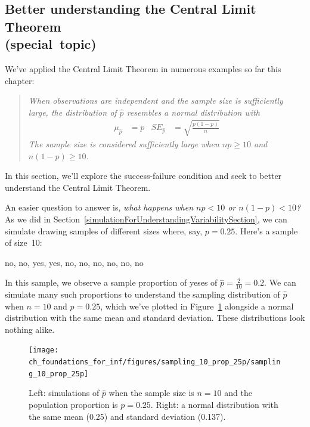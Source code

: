 \subsection[Better understanding the Central Limit Theorem
    (special~topic)]
  {Better understanding the Central Limit Theorem \\
      \mbox{(special~topic)}}



We've applied the Central Limit Theorem in numerous examples
so far this chapter:
\begin{quote}{\em
When observations are independent and the sample size is
sufficiently large, the distribution of $\hat{p}$ resembles
a normal distribution with
\begin{align*}
  \mu_{\hat{p}} &= p
  &SE_{\hat{p}} &= \sqrt{\frac{p (1 - p)}{n}}
\end{align*}
The sample size is considered sufficiently large
when $n p \geq 10$ and $n (1 - p) \geq 10$.
}\end{quote}
In this section, we'll explore the success-failure
condition and seek to better understand the
Central Limit Theorem.

An easier question to answer is, \emph{what happens when
$np < 10$ or $n(1-p) < 10$?} As we did in
Section~\ref{simulationForUnderstandingVariabilitySection},
we can simulate drawing samples of different sizes where,
say, $p = 0.25$. Here's a sample of
size~10:
\begin{center}
no, no, yes, yes, no, no, no, no, no, no
\end{center}
In this sample, we observe a sample proportion of yeses
of $\hat{p} = \frac{2}{10} = 0.2$. We can simulate many such
proportions to understand the sampling distribution of
$\hat{p}$ when $n = 10$ and $p = 0.25$, which we've plotted
in Figure~\ref{sampling_10_prop_25p}
alongside a normal distribution with the
same mean and standard deviation. These distributions
look nothing alike.

\begin{figure}[t]
   \centering
   \texttt{[image: ch\_foundations\_for\_inf/figures/sampling\_10\_prop\_25p/sampling\_10\_prop\_25p]}
   \caption{Left: simulations of $\hat{p}$ when the sample size
       is $n = 10$ and the population proportion is $p = 0.25$.
       Right: a normal distribution with the same mean (0.25)
       and standard deviation (0.137).}
   \label{sampling_10_prop_25p}
\end{figure}

